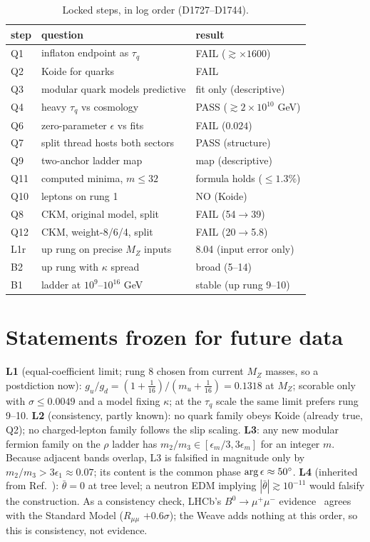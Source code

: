 \documentclass[aps,prd,twocolumn,superscriptaddress,nofootinbib,showkeys]{revtex4-2}
\begin{document}
\begin{table}[t]
\caption{\label{tab:steps}Locked steps, in log order (D1727--D1744).}
\begin{ruledtabular}\begin{tabular}{lll}
step & question & result\\ \hline
Q1 & inflaton endpoint as $\tau_q$ & FAIL ($\gtrsim\times1600$)\\
Q2 & Koide for quarks & FAIL\\
Q3 & modular quark models predictive & fit only (descriptive)\\
Q4 & heavy $\tau_q$ vs cosmology & PASS ($\gtrsim2\times10^{10}$ GeV)\\
Q6 & zero-parameter $\epsilon$ vs fits & FAIL ($0.024$)\\
Q7 & split thread hosts both sectors & PASS (structure)\\
Q9 & two-anchor ladder map & map (descriptive)\\
Q11 & computed minima, $m\le32$ & formula holds ($\le1.3\%$)\\
Q10 & leptons on rung 1 & NO (Koide)\\
Q8 & CKM, original model, split & FAIL (54$\to$39)\\
Q12 & CKM, weight-8/6/4, split & FAIL (20$\to$5.8)\\
L1r & up rung on precise $M_Z$ inputs & 8.04 (input error only)\\
B2 & up rung with $\kappa$ spread & broad (5--14)\\
B1 & ladder at $10^{9}$--$10^{16}$ GeV & stable (up rung 9--10)\\
\end{tabular}\end{ruledtabular}
\end{table}

\section{Statements frozen for future data}
\textbf{L1} (equal-coefficient limit; rung 8 chosen from current $M_Z$ masses, so a postdiction now): $g_u/g_d=(1+\tfrac1{16})/(m_u+\tfrac1{16})=0.1318$ at $M_Z$; scorable only with $\sigma\le0.0049$ and a model fixing $\kappa$; at the $\tau_q$ scale the same limit prefers rung 9--10.
\textbf{L2} (consistency, partly known): no quark family obeys Koide (already true, Q2); no charged-lepton family follows the slip scaling.
\textbf{L3}: any new modular fermion family on the $\rho$ ladder has $m_2/m_3\in[\epsilon_m/3,3\epsilon_m]$ for an integer $m$. Because adjacent bands overlap, L3 is falsified in magnitude only by $m_2/m_3>3\epsilon_1\approx0.07$; its content is the common phase ${\rm arg}\,\epsilon\approx50^\circ$.
\textbf{L4} (inherited from Ref.~\cite{FST}): $\bar\theta=0$ at tree level; a neutron EDM implying $|\bar\theta|\gtrsim10^{-11}$ would falsify the construction.
As a consistency check, LHCb's $B^0\to\mu^+\mu^-$ evidence~\cite{LHCb} agrees with the Standard Model ($R_{\mu\mu}$ $+0.6\sigma$); the Weave adds nothing at this order, so this is consistency, not evidence.
\end{document}

